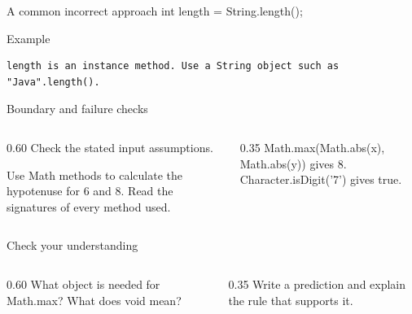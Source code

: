 \documentclass[10pt,aspectratio=169]{beamer}
\begin{document}
\begin{frame}[fragile,t]{A common incorrect approach}
int length = String.length();
\vspace{1mm}\begin{block}{Example}
\begin{lstlisting}
length is an instance method. Use a String object such as "Java".length().
\end{lstlisting}
\end{block}
\end{frame}

\begin{frame}[fragile,t]{Boundary and failure checks}
\begin{columns}[T,onlytextwidth]\begin{column}{0.60\textwidth}
Check the stated input assumptions.

Use Math methods to calculate the hypotenuse for 6 and 8. Read the signatures of every method used.
\end{column}\begin{column}{0.35\textwidth}\small
Math.max(Math.abs(x), Math.abs(y)) gives 8. Character.isDigit('7') gives true.
\end{column}\end{columns}
\end{frame}

\begin{frame}[fragile,t]{Check your understanding}
\begin{columns}[T,onlytextwidth]\begin{column}{0.60\textwidth}
What object is needed for Math.max? What does void mean?
\end{column}\begin{column}{0.35\textwidth}\small
Write a prediction and explain the rule that supports it.
\end{column}\end{columns}
\end{frame}
\end{document}
